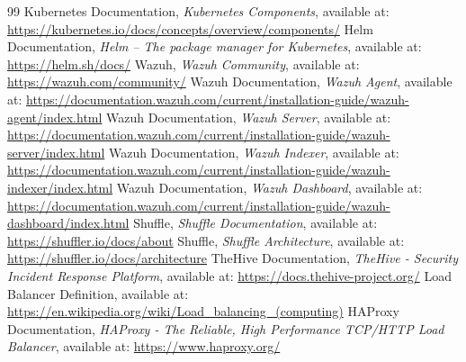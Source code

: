 \begin{thebibliography}{99}
 Kubernetes Documentation, \textit{Kubernetes Components}, available at: \url{https://kubernetes.io/docs/concepts/overview/components/}
 Helm Documentation, \textit{Helm -- The package manager for Kubernetes}, available at: \url{https://helm.sh/docs/}
 Wazuh, \textit{Wazuh Community}, available at: \url{https://wazuh.com/community/}
 Wazuh Documentation, \textit{Wazuh Agent}, available at: \url{https://documentation.wazuh.com/current/installation-guide/wazuh-agent/index.html}
 Wazuh Documentation, \textit{Wazuh Server}, available at: \url{https://documentation.wazuh.com/current/installation-guide/wazuh-server/index.html}
 Wazuh Documentation, \textit{Wazuh Indexer}, available at: \url{https://documentation.wazuh.com/current/installation-guide/wazuh-indexer/index.html}
 Wazuh Documentation, \textit{Wazuh Dashboard}, available at: \url{https://documentation.wazuh.com/current/installation-guide/wazuh-dashboard/index.html}
 Shuffle, \textit{Shuffle Documentation}, available at: \url{https://shuffler.io/docs/about}
 Shuffle, \textit{Shuffle Architecture}, available at: \url{https://shuffler.io/docs/architecture}
 TheHive Documentation, \textit{TheHive - Security Incident Response Platform}, available at: \url{https://docs.thehive-project.org/}
 Load Balancer Definition, available at: \url{https://en.wikipedia.org/wiki/Load_balancing_(computing)}
 HAProxy Documentation, \textit{HAProxy - The Reliable, High Performance TCP/HTTP Load Balancer}, available at: \url{https://www.haproxy.org/}
\end{thebibliography}